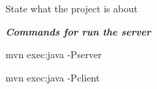 State what the project is about

{\itshape {\bfseries{Commands for run the server}}}

{\ttfamily mvn exec\+:java -\/Pserver}

{\ttfamily mvn exec\+:java -\/Pclient} 